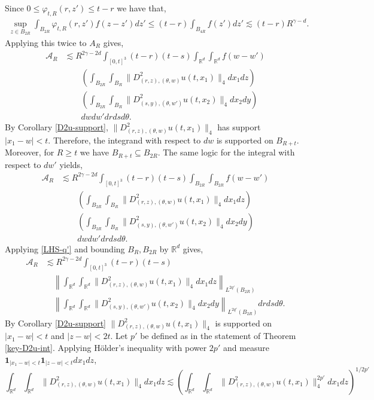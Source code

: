 \documentclass[12pt]{article}
\def\cA{\mathcal{A}}
\def\bR{\mathbb{R}}
\newcommand{\les}{\lesssim}
\begin{document}
Since $0 \leq \varphi_{t,R}(r,z') \leq t-r$ we have that, 
\begin{align*}
\sup_{z \in B_{2R}} \int_{B_{2R}}\varphi_{t,R}(r,z')f(z-z')dz' \leq (t-r)\int_{B_{4R}}f(z')dz' \les (t-r)R^{\gamma-d}.
\end{align*}
Applying this twice to $A_{R}$ gives,
\begin{align*}
\cA_{R} & \les R^{2\gamma-2d}\int_{[0,t]^3} (t-r)(t-s) \int_{\bR^d}\int_{\bR^d}f(w-w') \\
& \qquad \left(\int_{B_{2R}} \int_{B_R} \| D_{(r,z),(\theta,w)}^2 u(t,x_1) \|_4 dx_1 dz\right) \\
& \qquad \left(\int_{B_{2R}} \int_{B_R} \| D_{(s,y),(\theta,w')}^2 u(t,x_2)\|_4 dx_2 dy\right)\\
& \qquad dwdw'drdsd\theta.
\end{align*}
By Corollary \ref{D2u-support}, $\| D_{(r,z),(\theta,w)}^2 u(t,x_1) \|_4$ has support $|x_1-w| < t$. Therefore, the integrand with respect to $dw$ is supported on $B_{R+t}$. Moreover, for $R \geq t$ we have $B_{R+t} \subseteq B_{2R}$. The same logic for the integral with respect to $dw'$ yields, 
\begin{align*}
\cA_{R} & \les R^{2\gamma-2d}\int_{[0,t]^3} (t-r)(t-s) \int_{B_{2R}}\int_{B_{2R}}f(w-w') \\
& \qquad \left(\int_{B_{2R}} \int_{B_R} \| D_{(r,z),(\theta,w)}^2 u(t,x_1) \|_4 dx_1 dz\right) \\
& \qquad \left(\int_{B_{2R}} \int_{B_R} \| D_{(s,y),(\theta,w')}^2 u(t,x_2)\|_4 dx_2 dy\right)\\
& \qquad dwdw'drdsd\theta.
\end{align*}
Applying \eqref{LHS-q'} and bounding $B_R, B_{2R}$ by $\bR^d$ gives, 
\begin{align*}
\cA_{R} & \les R^{2\gamma-2d}\int_{[0,t]^3}(t-r)(t-s) \\
& \quad \left\| \int_{\bR^d} \int_{\bR^d} \| D_{(r,z),(\theta,w)}^2 u(t,x_1) \|_4 dx_1 dz \right\|_{L^{2q'}(B_{2R})} \\
& \quad \left\| \int_{\bR^d}\int_{\bR^d} \| D_{(s,y),(\theta,w')}^2 u(t,x_2)\|_4 dx_2 dy \right\|_{L^{2q'}(B_{2R})} drdsd\theta.
\end{align*}
By Corollary \ref{D2u-support} $\| D_{(r,z),(\theta,w)}^2 u(t,x_1) \|_4$ is supported on $|x_1-w| < t$ and $|z-w| < 2t$. Let $p'$ be defined as in the statement of Theorem \ref{key-D2u-int}. Applying H\"older's inequality with power $2p'$ and measure $\mathbf 1_{|x_1-w| < t}\mathbf 1_{|z-w| < t} dx_1dz$,
\[
 \int_{\bR^d} \int_{\bR^d} \| D_{(r,z),(\theta,w)}^2 u(t,x_1) \|_4 dx_1 dz \les \left(\int_{\bR^d} \int_{\bR^d} \| D_{(r,z),(\theta,w)}^2 u(t,x_1) \|^{2p'}_4 dx_1 dz \right)^{1/2p'} 
\]
\end{document}
